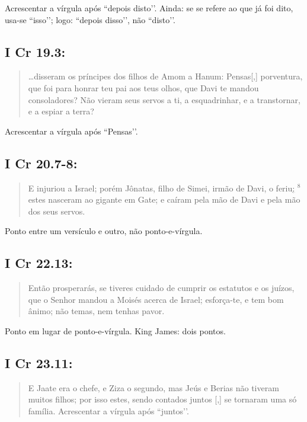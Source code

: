 Acrescentar a vírgula após ``depois disto’’. Ainda: se se refere ao que já foi dito, usa-se ``isso’’; logo: ``depois disso’’, não ``disto’’.

\subsection*{I Cr 19.3:} 
\begin{quote}
    \small
\ldots disseram os príncipes dos filhos de Amom a Hanum: Pensas[,] porventura, que foi para honrar teu pai aos teus olhos, que Davi te mandou consoladores? Não vieram seus servos a ti, a esquadrinhar, e a transtornar, e a espiar a terra?
\end{quote}

Acrescentar a vírgula após ``Pensas’’.

\subsection*{I Cr 20.7-8:} 
\begin{quote}
    \small
E injuriou a Israel; porém Jônatas, filho de Simei, irmão de Davi, o feriu\uline{;} $^{\mathrm{8}}$estes nasceram ao gigante em Gate; e caíram pela mão de Davi e pela mão dos seus servos.
\end{quote}
 
Ponto entre um versículo e outro, não ponto-e-vírgula.

\subsection*{I Cr 22.13:} 
\begin{quote}
    \small
 Então prosperarás, se tiveres cuidado de cumprir os estatutos e os juízos, que o Senhor mandou a Moisés acerca de Israel\uline{;} esforça-te, e tem bom ânimo; não temas, nem tenhas pavor.
\end{quote}
 
Ponto em lugar de ponto-e-vírgula. King James: dois pontos.

\subsection*{I Cr 23.11:} 
\begin{quote}
    \small
E Jaate era o chefe, e Ziza o segundo, mas Jeús e Berias não tiveram muitos filhos; por isso estes, sendo contados juntos [,] se tornaram uma só família.
Acrescentar a vírgula após ``juntos’’.
\end{quote}

